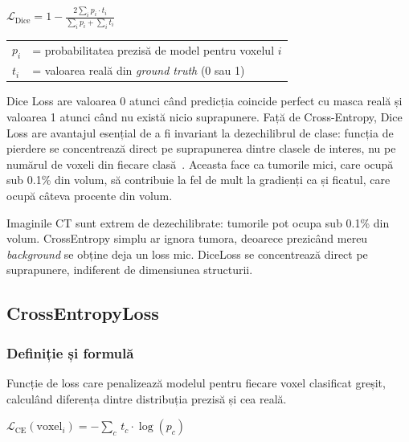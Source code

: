 \documentclass[12pt, a4paper]{report}
\newcommand{\formula}[1]{%
    \begin{center}
        \colorbox{codebackground}{%
            \parbox{0.88\textwidth}{\centering\vspace{4pt}$#1$\vspace{4pt}}%
        }
    \end{center}
}
\begin{document}
\formula{
    \mathcal{L}_{\text{Dice}} = 1 - \frac{2 \displaystyle\sum_{i} p_i \cdot t_i}
    {\displaystyle\sum_{i} p_i + \displaystyle\sum_{i} t_i}
}

\begin{center}
\begin{tabular}{ll}
    $p_i$ & = probabilitatea prezisă de model pentru voxelul $i$ \\
    $t_i$ & = valoarea reală din \textit{ground truth} (0 sau 1) \\
\end{tabular}
\end{center}

Dice Loss are valoarea 0 atunci când predicția coincide perfect cu masca reală și valoarea 1
atunci când nu există nicio suprapunere. Față de Cross-Entropy, Dice Loss are avantajul esențial
de a fi invariant la dezechilibrul de clase: funcția de pierdere se concentrează direct
pe suprapunerea dintre clasele de interes, nu pe numărul de voxeli din fiecare clasă~\cite{milletari2016vnet}.
Aceasta face ca tumorile mici, care ocupă sub 0.1\% din volum, să contribuie la fel de mult
la gradienți ca și ficatul, care ocupă câteva procente din volum.

\begin{goodbox}
Imaginile CT sunt extrem de dezechilibrate: tumorile pot ocupa sub 0.1\% din
volum. CrossEntropy simplu ar ignora tumora, deoarece prezicând mereu
\textit{background} se obține deja un loss mic. DiceLoss se concentrează
direct pe suprapunere, indiferent de dimensiunea structurii.
\end{goodbox}

\subsection{CrossEntropyLoss}
\label{sec:celoss}

\subsubsection{Definiție și formulă}

\vspace{4pt}
\begin{infobox}
Funcție de loss care penalizează modelul pentru fiecare voxel clasificat
greșit, calculând diferența dintre distribuția prezisă și cea reală.
\end{infobox}

\formula{
    \mathcal{L}_{\text{CE}}(\text{voxel}_i) =
    -\sum_{c} \, t_c \cdot \log(p_c)
}
\end{document}
